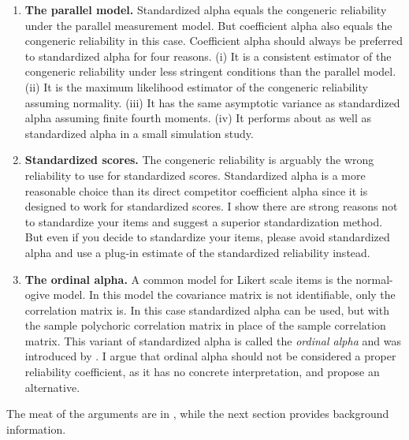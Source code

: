 \documentclass[twoside]{article}
\begin{document}
\begin{enumerate}[label=(\Alph*)]

\item \textbf{The parallel model.} Standardized alpha equals the congeneric reliability under the parallel measurement model. But coefficient alpha also equals the congeneric reliability in this case. Coefficient alpha should always be preferred to standardized alpha for four reasons. (i) It is a consistent estimator of the congeneric reliability under less stringent conditions than the parallel model. (ii) It is the maximum likelihood estimator of the congeneric reliability assuming normality. (iii) It has the same asymptotic variance as standardized alpha assuming finite fourth moments. (iv) It performs about as well as standardized alpha in a small simulation study.
\item \textbf{Standardized scores.} The congeneric reliability is arguably the wrong reliability to use for standardized scores. Standardized alpha is a more reasonable choice than its direct competitor coefficient alpha since it is designed to work for standardized scores. I show there are strong reasons not to standardize your items and suggest a superior standardization method. But even if you decide to standardize your items, please avoid standardized alpha and use a plug-in estimate of the standardized reliability instead.
\item \textbf{The ordinal alpha.} A common model for Likert scale items is the normal-ogive model. In this model the covariance matrix is not identifiable, only the correlation matrix is. In this case standardized alpha can be used, but with the sample polychoric correlation matrix in place of the sample correlation matrix. This variant of standardized alpha is called the \textit{ordinal alpha} and was introduced by \citet{Zumbo2007-ap}. I argue that ordinal alpha should not be considered a proper reliability coefficient, as it has no concrete interpretation, and propose an alternative.
\end{enumerate}

The meat of the arguments are in , while the next section provides background information.

\end{document}
